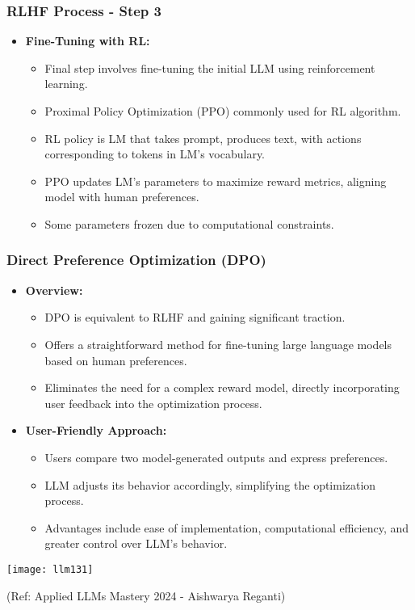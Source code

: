 \begin{frame}[fragile]\frametitle{RLHF Process - Step 3}
  \begin{itemize}
    \item \textbf{Fine-Tuning with RL:}
      \begin{itemize}
        \item Final step involves fine-tuning the initial LLM using reinforcement learning.
        \item Proximal Policy Optimization (PPO) commonly used for RL algorithm.
        \item RL policy is LM that takes prompt, produces text, with actions corresponding to tokens in LM's vocabulary.
        \item PPO updates LM's parameters to maximize reward metrics, aligning model with human preferences.
        \item Some parameters frozen due to computational constraints.
      \end{itemize}
  \end{itemize}
\end{frame}

\begin{frame}[fragile]\frametitle{Direct Preference Optimization (DPO)}
  \begin{itemize}
    \item \textbf{Overview:}
      \begin{itemize}
        \item DPO is equivalent to RLHF and gaining significant traction.
        \item Offers a straightforward method for fine-tuning large language models based on human preferences.
        \item Eliminates the need for a complex reward model, directly incorporating user feedback into the optimization process.
      \end{itemize}
    \item \textbf{User-Friendly Approach:}
      \begin{itemize}
        \item Users compare two model-generated outputs and express preferences.
        \item LLM adjusts its behavior accordingly, simplifying the optimization process.
        \item Advantages include ease of implementation, computational efficiency, and greater control over LLM's behavior.
      \end{itemize}
  \end{itemize}

\begin{center}
\texttt{[image: llm131]}
\end{center}				

{\tiny (Ref: Applied LLMs Mastery 2024 - Aishwarya Reganti)}

\end{frame}


